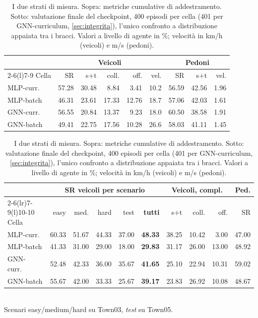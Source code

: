 \begin{table}[htbp]
  \centering\small
  \caption{I due strati di misura. Sopra: metriche cumulative di
  addestramento. Sotto: valutazione finale del checkpoint, 400 episodi
  per cella (401 per GNN-curriculum, \cref{sec:integrita}), l'unico
  confronto a distribuzione appaiata tra i bracci. Valori a livello di
  agente in \%; velocità in km/h (veicoli) e m/s (pedoni).}
  \label{tab:cumulative}
  \begin{tabular}{@{}lrrrrrrrr@{}}
    \toprule
    & \multicolumn{5}{c}{Veicoli} & \multicolumn{3}{c}{Pedoni} \\
    \cmidrule(lr){2-6}\cmidrule(l){7-9}
    Cella & SR & s$+$t & coll. & off. & vel. & SR & s$+$t & vel. \\
    \midrule
    MLP-curr.\ & 57.28 & 30.48 & 8.84 & 3.41 & 10.2 & 56.59 & 42.56 & 1.96 \\
    MLP-batch  & 46.31 & 23.61 & 17.33 & 12.76 & 18.7 & 57.06 & 42.03 & 1.61 \\
    GNN-curr.\ & 56.55 & 20.84 & 13.37 & 9.23 & 18.0 & 60.50 & 38.58 & 1.91 \\
    GNN-batch  & 49.41 & 22.75 & 17.56 & 10.28 & 26.6 & 58.03 & 41.11 & 1.45 \\
    \bottomrule
  \end{tabular}

  \vspace{1.2em}

  \begin{tabular}{@{}lrrrrrrrrr@{}}
    \toprule
    & \multicolumn{5}{c}{SR veicoli per scenario} &
      \multicolumn{3}{c}{Veicoli, compl.} & Ped. \\
    \cmidrule(lr){2-6}\cmidrule(lr){7-9}\cmidrule(l){10-10}
    Cella & easy & med. & hard & test & \textbf{tutti} & s$+$t & coll. & off. & SR \\
    \midrule
    MLP-curr.\ & 60.33 & 51.67 & 44.33 & 37.00 & \textbf{48.33} & 38.25 & 10.42 & 3.00 & 47.00 \\
    MLP-batch  & 41.33 & 31.00 & 29.00 & 18.00 & \textbf{29.83} & 31.17 & 26.00 & 13.00 & 48.92 \\
    GNN-curr.\ & 52.48 & 42.33 & 36.00 & 35.67 & \textbf{41.65} & 25.10 & 22.94 & 10.31 & 59.02 \\
    GNN-batch  & 55.67 & 42.00 & 33.33 & 25.67 & \textbf{39.17} & 23.83 & 26.92 & 10.08 & 48.67 \\
    \bottomrule
  \end{tabular}
  \\[0.3em]
  {\footnotesize Scenari easy/medium/hard su Town03, \emph{test} su Town05.}
\end{table}

